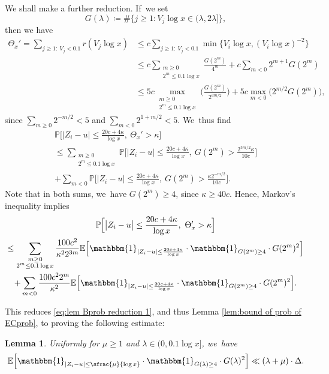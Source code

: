 \documentclass[10pt]{amsart}
\newcommand{\PP}{\mathbb{P}}
\newcommand{\EE}{\mathbb{E}}
\newcommand{\one}{\mathbbm{1}}
\newcommand{\bg}{\big}
\newcommand{\bgg}{\Big}
\theoremstyle{plain}
\newtheorem{lem}[cor]{Lemma}
\theoremstyle{definition}
\begin{document}
We shall make a further reduction. If~we set
\[
G(\lambda)\coloneqq \#\bg\{j\ge1: V_j\log x\in (\lambda,2\lambda] \bg\},
\]
then we have
\[
\begin{split}
\Theta_x' =\sum_{j\ge1:\ V_j<0.1} r(V_j\log x)
&\le c\sum_{j\ge1:\ V_j<0.1}\min\bg\{V_i\log x,(V_i\log x)^{-2}\bg\} \\
&\le c\sum_{\substack{m\ge0 \\ 2^m\le 0.1\log x}} \frac{G(2^m)}{4^m} + c \sum_{m<0} 2^{m+1} G(2^m) \\
&\le 5c \max_{\substack{m\ge0 \\ 2^m\le 0.1\log x}} \bgg(\frac{G(2^m)}{2^{3m/2}} \bgg) + 5c \max_{m<0}\bg(2^{m/2} G(2^m)\bg),
\end{split}
\]
since $\sum_{m\ge0}2^{-m/2} <5$ and $\sum_{m<0}2^{1+m/2}< 5$. We~thus find
\begin{multline*}
\PP\bgg[ \bg| Z_i - u \bg|\le \frac{20c+4\kappa}{\log x},\ \Theta_x'>\kappa \bgg] \\
\le \sum_{\substack{m\ge0 \\ 2^m\le 0.1\log x}} \!\!\! \PP\bgg[ \bg| Z_i - u \bg|\le \frac{20c+4\kappa}{\log x},\ G(2^m)> \frac{2^{3m/2} \kappa}{10c} \bgg] \\
+\sum_{m<0} \PP\bgg[ \bg| Z_i - u \bg|\le \frac{20c+4\kappa}{\log x},\ G(2^m)> \frac{\kappa 2^{-m/2}}{10c} \bgg].
\end{multline*}
Note that in both sums, we~have $G(2^m)\ge 4$, since $\kappa\ge 40c$. Hence, Markov's inequality implies
\begin{multline*}
\PP\bgg[ \bg| Z_i - u \bg|\le \frac{20c+4\kappa}{\log x},\ \Theta_x'>\kappa \bgg] \\
\le \sum_{\substack{m\ge0 \\ 2^m\le 0.1\log x}} \frac{100c^2}{\kappa^22^{3m}}
\EE\bgg[ \one_{| Z_i - u |\le \frac{20c+4\kappa}{\log x} } \cdot \one_{G(2^m) \ge4} \cdot G(2^m)^2\bgg] \\
+\sum_{m<0} \frac{100c^22^m}{\kappa^2}
\EE\bgg[ \one_{| Z_i - u |\le \frac{20c+4\kappa}{\log x} }\cdot \one_{G(2^m) \ge4}\cdot G(2^m)^2\bgg].
\end{multline*}

This reduces \eqref{eq:lem Bprob reduction 1}, and thus Lemma \ref{lem:bound of prob of ECprob}, to proving the following estimate:

\begin{lem}
\label{lem:Bprob reduction 2} Uniformly for $\mu\ge1$ and $\lambda\in(0,0.1\log x]$, we~have
\[
\EE\bgg[ \one_{| Z_i - u |\le \sfrac{\mu}{\log x} } \cdot \one_{G(\lambda) \ge4} \cdot G(\lambda)^2 \bgg]
\ll (\lambda+\mu)\cdot \Delta.
\]
\end{lem}
\end{document}
